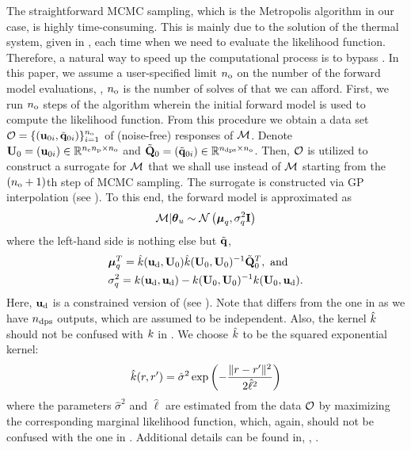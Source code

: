 The straightforward MCMC sampling, which is the Metropolis algorithm in our case, is highly time-consuming. This is mainly due to the solution of the thermal system, given in , each time when we need to evaluate the likelihood function. Therefore, a natural way to speed up the computational process is to bypass . In this paper, we assume a user-specified limit ${n_\text{o}}$ on the number of the forward model evaluations, \ie, ${n_\text{o}}$ is the number of solves of  that we can afford. First, we run ${n_\text{o}}$ steps of the algorithm wherein the initial forward model is used to compute the likelihood function. From this procedure we obtain a data set $\mathcal{O} = \{ (\mathbf{u}_{0i}, \tilde{\mathbf{q}}_{0i}) \}_{i = 1}^{n_\text{o}}$ of (noise-free) responses of $\model$. Denote $\mathbf{U}_0 = (\mathbf{u}_{0i}) \in \mathbb{R}^{{n_{\text{c}}} {n_\text{p}} \times {n_\text{o}}}$ and $\tilde{\mathbf{Q}}_0 = (\tilde{\mathbf{q}}_{0i}) \in \mathbb{R}^{{n_\text{dps}} \times {n_\text{o}}}$. Then, $\mathcal{O}$ is utilized to construct a surrogate for $\model$ that we shall use instead of $\model$ starting from the $({n_\text{o}} + 1)$th step of MCMC sampling. The surrogate is constructed via GP interpolation (see ). To this end, the forward model is approximated as
\begin{equation} \elabel{gp-approximation}
  \model | \vparam_\u \sim \gaussian{\vmean_\T}{\sigma^2_\T \mI}
\end{equation}
where the left-hand side is nothing else but $\tilde{\mathbf{q}}$,
\begin{align}
  & \vmean_\T^T = \hat{\fCov}(\vu_\data, \mU_0) \hat{\fCov}(\mU_0, \mU_0)^{-1} \mmT_0^T, \text{ and} \elabel{gp-mean} \\
  & \sigma^2_\T = \fCov{\vu_\data, \vu_\data} - \fCov{\mU_0, \mU_0}^{-1} \fCov{\mU_0, \vu_\data}. \elabel{gp-variance}
\end{align}
Here, $\mathbf{u}_{\text{d}}$ is a constrained version of  (see ). Note that  differs from the one in  as we have ${n_\text{dps}}$ outputs, which are assumed to be independent. Also, the kernel $\hat{\fCov}$ should not be confused with $\fCov$ in . We choose $\hat{\fCov}$ to be the squared exponential kernel:
\[
  \hat{\fCov}(\r, \r') = \hat{\sigma}^2 \exp\left(-\frac{\norm{\r - \r'}^2}{2 \hat{\ell}^2}\right)
\]
where the parameters $\hat{\sigma}^2$ and $\hat{\ell}$ are estimated from the data $\mathcal{O}$ by maximizing the corresponding marginal likelihood function, which, again, should not be confused with the one in . Additional details can be found in, \eg, \cite{mackay2003, rasmussen2006}.

